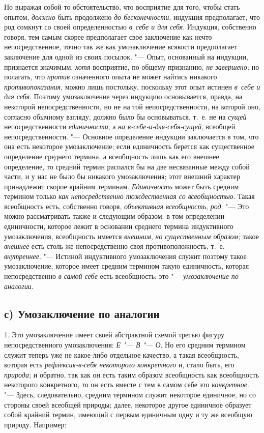 Но выражая собой то обстоятельство, что восприятие для того,
чтобы стать опытом, {\em должно}
быть продолжено {\em до
бесконечности}, индукция предполагает, что род сомкнут со
своей определенностью {\em в~себе и для
себя}. Индукция, собственно говоря, тем самым скорее
предполагает свое заключение как нечто непосредственное, точно так же как
умозаключение всякости предполагает заключение для одной из своих посылок.
"--- Опыт, основанный на индукции, признается значимым,
{\em хотя} восприятие, по
общему признанию, {\em не завершено;}
но полагать, что
{\em против} означенного
опыта не может найтись никакого
{\em противопоказания},
можно лишь постольку, поскольку этот опыт истинен
{\em в~себе и для себя}.
Поэтому умозаключение через индукцию основывается, правда, на
некоторой непосредственности, но не на той непосредственности, на которой
оно, согласно обычному взгляду, должно было бы основываться, т.~е. не на
{\em сущей}
непосредственности
{\em единичности}, а
{\em на в-себе-и-для-себя-сущей},
всеобщей непосредственности. "--- Основное
определение индукции заключается в том, что она есть некоторое
умозаключение; если единичность берется как существенное определение
среднего термина, а всеобщность лишь как его внешнее определение, то
средний термин распался бы на две несвязанные между собой части, и у нас не
было бы никакого умозаключения; этот внешний характер принадлежит скорое
крайним терминам. {\em Единичность}
может быть средним термином только
{\em как непосредственно тождественная
со всеобщностью}. Такая всеобщность есть, собственно говоря,
{\em объективная всеобщность},
{\em род}. "--- Это можно
рассматривать также и следующим образом: в том определении единичности,
которое лежит в основании среднего термина индуктивного умозаключения,
всеобщность имеется {\em внешним},
{\em но существенным образом;}
такое {\em внешнее}
есть столь же непосредственно своя противоположность, т.~е.
{\em внутреннее}. "---
Истиной индуктивного умозаключения служит поэтому
такое умозаключение, которое имеет средним термином такую
единичность, которая непосредственно
{\em в самой себе} есть
всеобщность; это "--- {\em умозаключение по
аналогии}.

\subsection[с) Умозаключение по аналогии]{с) Умозаключение по аналогии}

1. Это умозаключение имеет своей абстрактной схемой третью
фигуру непосредственного умозаключения:
{\em Е "--- В
"--- О}. Но его средним термином служит теперь
уже не какое-либо отдельное качество, а такая всеобщность, которая есть
{\em рефлексия-в-себя некоторого
конкретного} и, стало быть, его
{\em природа;} и обратно,
так как он есть таким образом всеобщность как всеобщность некоторого
конкретного, то он есть вместе с тем в самом себе это
{\em конкретное}. "---
Здесь, следовательно, средним термином служит некоторое
единичное, но со стороны своей всеобщей природы; далее, некоторое другое
единичное образует собой крайний термин, имеющий с первым единичным одну и
ту же всеобщую природу. Например:

